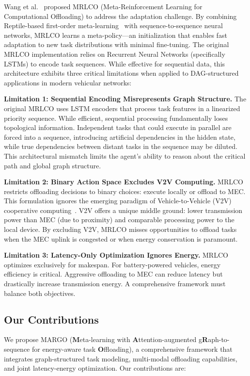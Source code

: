 \documentclass[journal,twoside]{IEEEtran}
\newcommand{\method}{\textsc{MARGO}}
\newcommand{\baseline}{\textsc{MRLCO}}
\begin{document}
Wang et al.~\cite{wang2020fast} proposed \baseline{} (Meta-Reinforcement Learning for Computational Offloading) to address the adaptation challenge. By combining Reptile-based first-order meta-learning~\cite{nichol2018reptile} with sequence-to-sequence neural networks, \baseline{} learns a meta-policy---an initialization that enables fast adaptation to new task distributions with minimal fine-tuning. The original \baseline{} implementation relies on Recurrent Neural Networks (specifically LSTMs) to encode task sequences. While effective for sequential data, this architecture exhibits three critical limitations when applied to DAG-structured applications in modern vehicular networks:

\textbf{Limitation 1: Sequential Encoding Misrepresents Graph Structure.} The original \baseline{} uses LSTM encoders that process task features in a linearized priority sequence. While efficient, sequential processing fundamentally loses topological information. Independent tasks that could execute in parallel are forced into a sequence, introducing artificial dependencies in the hidden state, while true dependencies between distant tasks in the sequence may be diluted. This architectural mismatch limits the agent's ability to reason about the critical path and global graph structure.

\textbf{Limitation 2: Binary Action Space Excludes V2V Computing.} \baseline{} restricts offloading decisions to binary choices: execute locally or offload to MEC. This formulation ignores the emerging paradigm of Vehicle-to-Vehicle (V2V) cooperative computing~\cite{sun2019v2v, feng2017mobile}. V2V offers a unique middle ground: lower transmission power than MEC (due to proximity) and comparable processing power to the local device. By excluding V2V, \baseline{} misses opportunities to offload tasks when the MEC uplink is congested or when energy conservation is paramount.

\textbf{Limitation 3: Latency-Only Optimization Ignores Energy.} \baseline{} optimizes exclusively for makespan. For battery-powered vehicles, energy efficiency is critical. Aggressive offloading to MEC can reduce latency but drastically increase transmission energy. A comprehensive framework must balance both objectives.

\subsection{Our Contributions}

We propose \method{} (\textbf{M}eta-learning with \textbf{A}ttention-augmented g\textbf{R}aph-to-sequence for energy-aware task \textbf{O}ffloading), a comprehensive framework that integrates graph-structured task modeling, multi-modal offloading capabilities, and joint latency-energy optimization. Our contributions are:
\end{document}
